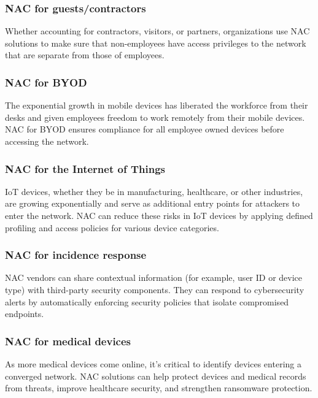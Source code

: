 \subsubsection{NAC for guests/contractors}

Whether accounting for contractors, visitors, or partners, organizations use NAC solutions to make sure that non-employees have access privileges to the network that are separate from those of employees.

 
\subsubsection{NAC for BYOD}

The exponential growth in mobile devices has liberated the workforce from their desks and given employees freedom to work remotely from their mobile devices. NAC for BYOD ensures compliance for all employee owned devices before accessing the network.


\subsubsection{NAC for the Internet of Things}

IoT devices, whether they be in manufacturing, healthcare, or other industries, are growing exponentially and serve as additional entry points for attackers to enter the network. NAC can reduce these risks in IoT devices by applying defined profiling and access policies for various device categories.

\subsubsection{NAC for incidence response}

NAC vendors can share contextual information (for example, user ID or device type) with third-party security components. They can respond to cybersecurity alerts by automatically enforcing security policies that isolate compromised endpoints.

\subsubsection{NAC for medical devices}

As more medical devices come online, it’s critical to identify devices entering a converged network. NAC solutions can help protect devices and medical records from threats, improve healthcare security, and strengthen ransomware protection.

